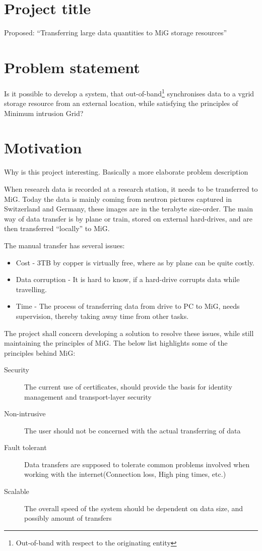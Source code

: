 \documentclass[paper=a4, fontsize=11pt]{scrartcl} %
\numberwithin{equation}{section} %
\numberwithin{figure}{section} %
\numberwithin{table}{section} %
\begin{document}
\section{Project title}
Proposed: ``Transferring large data quantities to MiG storage resources''

\section{Problem statement}
Is it possible to develop a system, that out-of-band\footnote{Out-of-band with 
respect to the originating entity} synchronises data to a vgrid storage 
resource from an external location, while satisfying the principles of Minimum 
intrusion Grid?

\section{Motivation}
Why is this project interesting. Basically a more elaborate problem description

When research data is recorded at a research station, it needs to be
transferred to MiG. Today the data is mainly coming from neutron pictures
captured in Switzerland and Germany, these images are in the terabyte 
size-order. The main way of data transfer is by plane or train, stored on
external hard-drives, and are then transferred ``locally'' to MiG.

The manual transfer has several issues:
\begin{itemize}
\item Cost - 3TB by copper is virtually free, where as by plane can be quite
    costly.
\item Data corruption - It is hard to know, if a hard-drive corrupts data while 
    travelling.
\item Time - The process of transferring data from drive to PC to MiG, needs
    supervision, thereby taking away time from other tasks.
\end{itemize}

The project shall concern developing a solution to resolve these issues, while
still maintaining the principles of MiG\cite{cpa2005arch}. The below list 
highlights some of the principles behind MiG:

\begin{description}
\item [Security] The current use of certificates, should provide the basis for
    identity management and transport-layer security
\item [Non-intrusive] The user should not be concerned with the actual
    transferring of data
\item[Fault tolerant] Data transfers are supposed to tolerate common problems
    involved when working with the internet(Connection loss, High ping times,
    etc.)
\item[Scalable] The overall speed of the system should be dependent on data 
    size, and possibly amount of transfers
\end{description}
\end{document}
